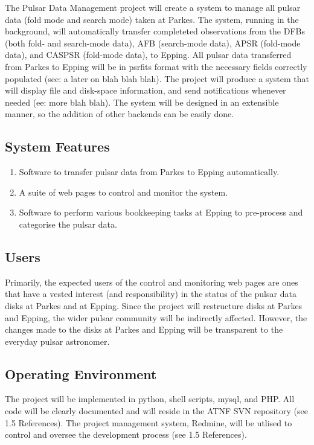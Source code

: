 \documentclass[a4paper,11pt]{article}
\begin{document}
The Pulsar Data Management project will create a system to manage all pulsar data (fold mode and search mode) taken at Parkes. The system, running in the background, will automatically transfer completeted observations from the DFBs (both fold- and search-mode data), AFB (search-mode data), APSR (fold-mode data), and CASPSR (fold-mode data), to Epping. All pulsar data transferred from Parkes to Epping will be in psrfits format with the necessary fields correctly populated (see: a later on blah blah blah). The project will produce a system that will display file and disk-space information, and send notifications whenever needed (ee: more blah blah). The system will be designed in an extensible manner, so the addition of other backends can be easily done.

\subsection{System Features}
\begin{enumerate}
\item Software to transfer pulsar data from Parkes to Epping automatically.
\item A suite of web pages to control and monitor the system.
\item Software to perform various bookkeeping tasks at Epping to pre-process and categorise the pulsar data.
\end{enumerate}

\subsection{Users}
Primarily, the expected users of the control and monitoring web pages are ones that have a vested interest (and responsibility) in the status of the pulsar data disks at Parkes and at Epping. Since the project will restructure disks at Parkes and Epping, the wider pulsar community will be indirectly affected. However, the changes made to the disks at Parkes and Epping will be transparent to the everyday pulsar astronomer.

\subsection{Operating Environment}
The project will be implemented in python, shell scripts, mysql, and PHP. All code will be clearly documented and will reside in the ATNF SVN repository (see 1.5 References). The project management system, Redmine, will be utlised to control and oversee the development process (see 1.5 References).
\end{document}
